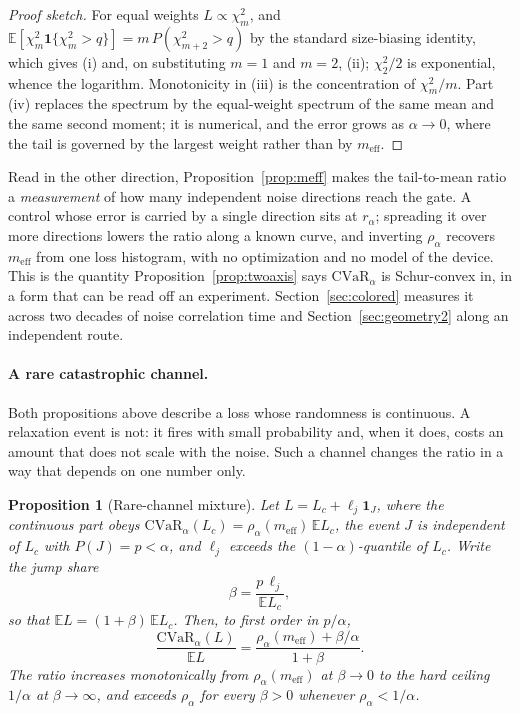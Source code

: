 \documentclass[aps,pra,twocolumn,superscriptaddress,reprint,nofootinbib,floatfix]{revtex4-2}
\newtheorem{proposition}{Proposition}
\theoremstyle{definition}
\newcommand{\cvar}{\mathrm{CVaR}}
\newcommand{\E}{\mathbb{E}}
\begin{document}
\begin{proof}[Proof sketch]
For equal weights $L\propto\chi^2_m$, and
$\E[\chi^2_m\mathbf 1\{\chi^2_m>q\}]=m\,P(\chi^2_{m+2}>q)$ by the standard
size-biasing identity, which gives (i) and, on substituting $m=1$ and $m=2$,
(ii); $\chi^2_2/2$ is exponential, whence the logarithm. Monotonicity in (iii)
is the concentration of $\chi^2_m/m$. Part (iv) replaces the spectrum by the
equal-weight spectrum of the same mean and the same second moment; it is
numerical, and the error grows as $\alpha\to0$, where the tail is governed by
the largest weight rather than by $m_{\mathrm{eff}}$.
\end{proof}

Read in the other direction, Proposition~\ref{prop:meff} makes the
tail-to-mean ratio a \emph{measurement} of how many independent noise
directions reach the gate. A control whose error is carried by a single
direction sits at $r_\alpha$; spreading it over more directions lowers the
ratio along a known curve, and inverting $\rho_\alpha$ recovers
$m_{\mathrm{eff}}$ from one loss histogram, with no optimization and no model
of the device. This is the quantity Proposition~\ref{prop:twoaxis} says
$\cvar_\alpha$ is Schur-convex in, in a form that can be read off an
experiment. Section~\ref{sec:colored} measures it across two decades of noise
correlation time and Section~\ref{sec:geometry2} along an independent route.

\paragraph*{A rare catastrophic channel.} Both propositions above describe a
loss whose randomness is continuous. A relaxation event is not: it fires with
small probability and, when it does, costs an amount that does not scale with
the noise. Such a channel changes the ratio in a way that depends on one
number only.

\begin{proposition}[Rare-channel mixture]
\label{prop:mixture}
Let $L=L_c+\ell_j\mathbf 1_J$, where the continuous part obeys
$\cvar_\alpha(L_c)=\rho_\alpha(m_{\mathrm{eff}})\,\E L_c$, the event $J$ is
independent of $L_c$ with $P(J)=p<\alpha$, and $\ell_j$ exceeds the
$(1-\alpha)$-quantile of $L_c$. Write the \emph{jump share}
\begin{equation}
\beta=\frac{p\,\ell_j}{\E L_c},
\label{eq:beta}
\end{equation}
so that $\E L=(1+\beta)\,\E L_c$. Then, to first order in $p/\alpha$,
\begin{equation}
\frac{\cvar_\alpha(L)}{\E L}
=\frac{\rho_\alpha(m_{\mathrm{eff}})+\beta/\alpha}{1+\beta}.
\label{eq:mixture}
\end{equation}
The ratio increases monotonically from $\rho_\alpha(m_{\mathrm{eff}})$ at
$\beta\to0$ to the hard ceiling $1/\alpha$ at $\beta\to\infty$, and exceeds
$\rho_\alpha$ for every $\beta>0$ whenever $\rho_\alpha<1/\alpha$.
\end{proposition}
\end{document}
